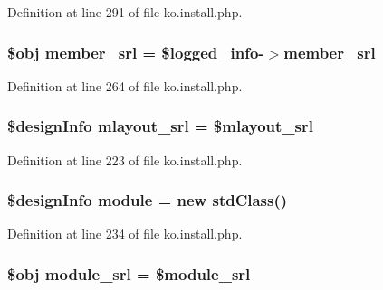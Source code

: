 Definition at line 291 of file ko.\+install.\+php.

\subsubsection[{\texorpdfstring{member\+\_\+srl}{member_srl}}]{\setlength{\rightskip}{0pt plus 5cm}\$obj member\+\_\+srl = \$logged\+\_\+info-\/$>$member\+\_\+srl}\hypertarget{ko_8install_8php_aa61f9e08f0fe505094d26f8143f30bbd}{}\label{ko_8install_8php_aa61f9e08f0fe505094d26f8143f30bbd}


Definition at line 264 of file ko.\+install.\+php.

\subsubsection[{\texorpdfstring{mlayout\+\_\+srl}{mlayout_srl}}]{\setlength{\rightskip}{0pt plus 5cm}\$design\+Info mlayout\+\_\+srl = \$mlayout\+\_\+srl}\hypertarget{ko_8install_8php_a9cf497537007b08c645bed35f564be54}{}\label{ko_8install_8php_a9cf497537007b08c645bed35f564be54}


Definition at line 223 of file ko.\+install.\+php.

\subsubsection[{\texorpdfstring{module}{module}}]{\setlength{\rightskip}{0pt plus 5cm}\$design\+Info {\bf module} = new std\+Class()}\hypertarget{ko_8install_8php_a5c3fc1968f94c2b6a7c60845f284de78}{}\label{ko_8install_8php_a5c3fc1968f94c2b6a7c60845f284de78}


Definition at line 234 of file ko.\+install.\+php.

\subsubsection[{\texorpdfstring{module\+\_\+srl}{module_srl}}]{\setlength{\rightskip}{0pt plus 5cm}\$obj module\+\_\+srl = \$module\+\_\+srl}\hypertarget{ko_8install_8php_a370bb6450fab1da3e0ed9f484a38b761}{}\label{ko_8install_8php_a370bb6450fab1da3e0ed9f484a38b761}


